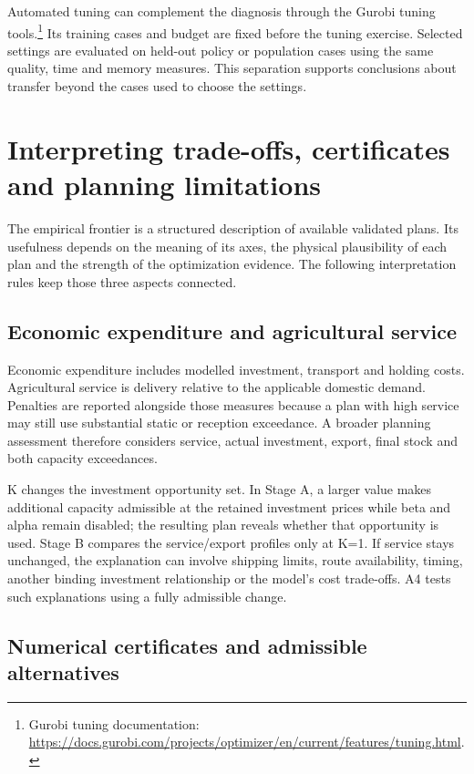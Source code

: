 \documentclass[11pt,a4paper]{article}
\newcommand{\technical}[2]{\footnote{#1: \url{#2}.}}
\begin{document}
Automated tuning can complement the diagnosis through the Gurobi tuning tools.\technical{Gurobi tuning documentation}{https://docs.gurobi.com/projects/optimizer/en/current/features/tuning.html} Its training cases and budget are fixed before the tuning exercise. Selected settings are evaluated on held-out policy or population cases using the same quality, time and memory measures. This separation supports conclusions about transfer beyond the cases used to choose the settings.

\section{Interpreting trade-offs, certificates and planning limitations}
\label{app:interpretation}

The empirical frontier is a structured description of available validated plans. Its usefulness depends on the meaning of its axes, the physical plausibility of each plan and the strength of the optimization evidence. The following interpretation rules keep those three aspects connected.

\subsection{Economic expenditure and agricultural service}

Economic expenditure includes modelled investment, transport and holding costs. Agricultural service is delivery relative to the applicable domestic demand. Penalties are reported alongside those measures because a plan with high service may still use substantial static or reception exceedance. A broader planning assessment therefore considers service, actual investment, export, final stock and both capacity exceedances.

K changes the investment opportunity set. In Stage A, a larger value makes additional capacity admissible at the retained investment prices while beta and alpha remain disabled; the resulting plan reveals whether that opportunity is used. Stage B compares the service/export profiles only at K=1. If service stays unchanged, the explanation can involve shipping limits, route availability, timing, another binding investment relationship or the model's cost trade-offs. A4 tests such explanations using a fully admissible change.

\subsection{Numerical certificates and admissible alternatives}
\end{document}
